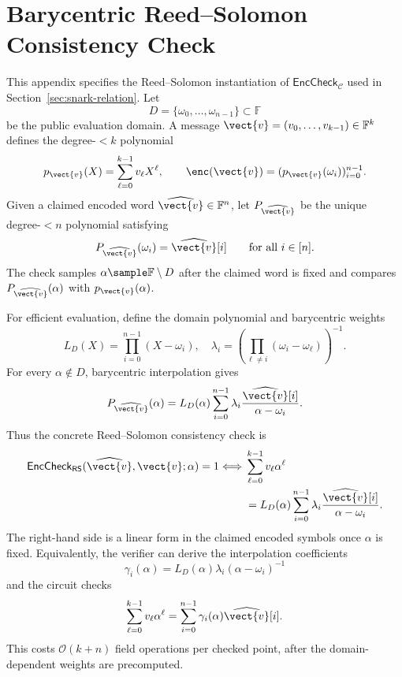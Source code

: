 \section{Barycentric Reed--Solomon Consistency Check}
\label{app:rs-barycentric}

This appendix specifies the Reed--Solomon instantiation of
\(\mathsf{EncCheck}_{\mathcal{C}}\) used in
Section~\ref{sec:snark-relation}.  Let
\[
D=\{\omega_0,\ldots,\omega_{n-1}\}\subset\mathbb{F}
\]
be the public evaluation domain.  A message
\(\vect{v}=(v_0,\ldots,v_{k-1})\in\mathbb{F}^k\) defines the degree-\(<k\)
polynomial
\[
  p_{\vect{v}}(X)=\sum_{\ell=0}^{k-1} v_\ell X^\ell,
  \qquad
  \enc(\vect{v})=(p_{\vect{v}}(\omega_i))_{i=0}^{n-1}.
\]
Given a claimed encoded word
\(\widehat{\vect{v}}\in\mathbb{F}^n\), let
\(P_{\widehat{\vect{v}}}\) be the unique degree-\(<n\) polynomial satisfying
\[
  P_{\widehat{\vect{v}}}(\omega_i)=\widehat{\vect{v}}[i]
  \qquad\text{for all }i\in[n].
\]
The check samples \(\alpha\sample\mathbb{F}\setminus D\) after the claimed
word is fixed and compares \(P_{\widehat{\vect{v}}}(\alpha)\) with
\(p_{\vect{v}}(\alpha)\).

For efficient evaluation, define the domain polynomial and barycentric weights
\[
  L_D(X)=\prod_{i=0}^{n-1}(X-\omega_i),
  \quad
  \lambda_i
  =
  \left(\prod_{\ell\neq i}(\omega_i-\omega_\ell)\right)^{-1}.
\]
For every \(\alpha\notin D\), barycentric interpolation gives
\[
  P_{\widehat{\vect{v}}}(\alpha)
  =
  L_D(\alpha)
  \sum_{i=0}^{n-1}
  \lambda_i
  \frac{\widehat{\vect{v}}[i]}{\alpha-\omega_i}.
\]
Thus the concrete Reed--Solomon consistency check is
\[
\begin{aligned}
\mathsf{EncCheck}_{\mathsf{RS}}
(\widehat{\vect{v}},\vect{v};\alpha)=1
\Longleftrightarrow{}&
\sum_{\ell=0}^{k-1} v_\ell \alpha^\ell
\\
&=
L_D(\alpha)
\sum_{i=0}^{n-1}
\lambda_i
\frac{\widehat{\vect{v}}[i]}{\alpha-\omega_i}.
\end{aligned}
\]
The right-hand side is a linear form in the claimed encoded symbols once
\(\alpha\) is fixed.  Equivalently, the verifier can derive the interpolation
coefficients
\[
  \gamma_i(\alpha)
  =
  L_D(\alpha)\lambda_i(\alpha-\omega_i)^{-1}
\]
and the circuit checks
\[
  \sum_{\ell=0}^{k-1} v_\ell \alpha^\ell
  =
  \sum_{i=0}^{n-1}\gamma_i(\alpha)\widehat{\vect{v}}[i].
\]
This costs \(\mathcal{O}(k+n)\) field operations per checked point, after the
domain-dependent weights are precomputed.

